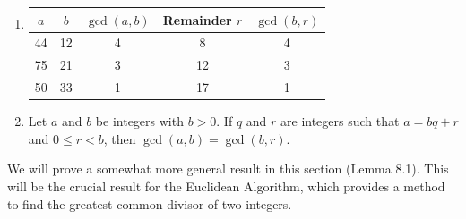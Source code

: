 \documentclass[11pt]{article}
\begin{document}
\begin{enumerate}
\item \begin{tabular}[t]{| c | c | c | c | c |} \hline
$a$  &  $b$  &  $\gcd \left( {a, b} \right)$  &  Remainder $r$  &  $\gcd \left( {b, r} \right)$
\\ \hline
44  &  12  &  4  &  8  &  4  \\ \hline
75  &  21  &  3  &  12  &  3  \\ \hline
50  &  33  &  1  &  17  &  1  \\ \hline
\end{tabular}

\item Let  $a$  and  $b$  be integers with  $b > 0$.  If  $q$  and  $r$  are integers such that  
$a = bq + r$ and  $0 \leq r < b$, then  
$\gcd \left( {a, b} \right) = \gcd \left( {b, r} \right)$.
\end{enumerate}

\eighth
\noindent
We will prove a somewhat more general result in this section (Lemma 8.1).  This will be the crucial result for the Euclidean Algorithm, which provides a method to find the greatest common divisor of two integers.
\hbreak
\end{document}
